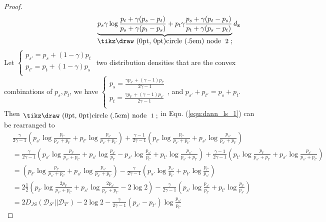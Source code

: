 \documentclass{article} \usepackage{iclr2023_conference,times}
\newcommand{\myref}[1]{Equ. (\ref{#1})}
\newcommand{\z}{\mathbf{z}}
\newcommand{\D}{\mathcal{D}}
\newcommand*{\circled}[1]{\lower.7ex\hbox{\tikz\draw (0pt, 0pt)circle (.5em) node {\makebox[1em][c]{\small #1}};}}
\begin{document}
\begin{proof}
\begin{equation}
\begin{aligned}
&\quad\quad\quad\quad\quad\quad\quad\quad\quad\quad\quad\quad\underbrace{p_s\gamma\log\frac{p_t+\gamma(p_s-p_t)}{p_s+\gamma(p_t-p_s)}+p_t\gamma\frac{p_s+\gamma(p_t-p_s)}{p_t+\gamma(p_s-p_t)}}_{\rm \circled{\rm 2}} d_\z
\end{aligned}\label{equ:dann_ls_1}
\end{equation}
Let $\left\{         \begin{array}{c} 
    p_{s'}=p_s+(1-\gamma)p_t\\ 
    p_{t'}=p_t+(1-\gamma)p_s\\ 
  \end{array}\right.$ 
 two distribution densities that are the convex combinations of $p_s,p_t$, we have 
  $\left\{         \begin{array}{c} 
    p_{s}=\frac{\gamma p_{s'}+(\gamma-1)p_{t'}}{2\gamma-1}\\ 
    p_{t}=\frac{\gamma p_{t'}+(\gamma-1)p_{s'}}{2\gamma-1}\\ 
  \end{array}\right.$, and $p_{s'}+p_{t'}=p_s+p_t$. 
Then $\rm \circled{\rm 1}$ in \myref{equ:dann_ls_1} can be rearranged to
\begin{equation}
\begin{aligned}
&\frac{\gamma}{2\gamma-1}\left(p_{s'}\log\frac{p_{t'}}{p_{s'}+p_{t'}} + p_{t'}\log\frac{p_{s'}}{p_{s'}+p_{t'}}\right)+\frac{\gamma-1}{2\gamma-1}\left(p_{t'}\log\frac{p_{t'}}{p_{s'}+p_{t'}}+p_{s'}\log\frac{p_{s'}}{p_{s'}+p_{t'}}\right)\\
&=\frac{\gamma}{2\gamma-1}\left(p_{s'}\log\frac{p_{t'}}{p_{s'}+p_{t'}}+p_{s'}\log\frac{p_{s'}}{p_{t'}}-p_{s'}\log\frac{p_{s'}}{p_{t'}} + p_{t'}\log\frac{p_{s'}}{p_{s'}+p_{t'}}\right)+\frac{\gamma-1}{2\gamma-1}\left(p_{t'}\log\frac{p_{t'}}{p_{s'}+p_{t'}}+p_{s'}\log\frac{p_{s'}}{p_{s'}+p_{t'}}\right)\\
&=\left(p_{t'}\log\frac{p_{t'}}{p_{s'}+p_{t'}}+p_{s'}\log\frac{p_{s'}}{p_{s'}+p_{t'}}\right)-\frac{\gamma}{2\gamma-1}\left(p_{s'}\log\frac{p_{s'}}{p_{t'}} +p_{t'}\log\frac{p_{t'}}{p_{s'}} \right)
\\
&= 2\frac{1}{2}\left(p_{t'}\log\frac{2p_{t'}}{p_{s'}+p_{t'}}+p_{s'}\log\frac{2p_{s'}}{p_{s'}+p_{t'}}-2\log2\right)-\frac{\gamma}{2\gamma-1}\left(p_{s'}\log\frac{p_{s'}}{p_{t'}} +p_{t'}\log\frac{p_{t'}}{p_{s'}} \right)\\
&=2D_{JS}(\D_{S'}||\D_{T'})-2\log2-\frac{\gamma}{2\gamma-1}\left(p_{s'}-p_{t'}\right)\log\frac{p_{s'}}{p_{t'}}
\end{aligned}\end{equation}

\end{proof}
\end{document}
